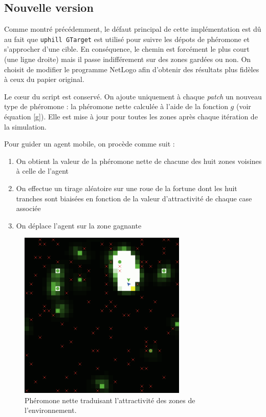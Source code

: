 \documentclass[12pt]{article}
\begin{document}
\subsection{Nouvelle version}

Comme montré précédemment, le défaut principal de cette implémentation
est dû au fait que \texttt{uphill GTarget} est utilisé pour suivre les
dépots de phéromone et s'approcher d'une cible. En conséquence, le
chemin est forcément le plus court (une ligne droite) mais il passe
indifférement sur des zones gardées ou non. On choisit de modifier le
programme NetLogo afin d'obtenir des résultats plus fidèles à ceux du
papier original.

Le c\oe ur du script est conservé. On ajoute uniquement à chaque
\textit{patch} un nouveau type de phéromone : la phéromone nette
calculée à l'aide de la fonction $g$ (voir équation \ref{g}). Elle est
mise à jour pour toutes les zones après chaque itération de la
simulation.

Pour guider un agent mobile, on procède comme suit :

\begin{enumerate}
  \item{On obtient la valeur de la phéromone nette de chacune des huit
    zones voisines à celle de l'agent}
  \item{On effectue un tirage aléatoire sur une roue de la fortune
    dont les huit tranches sont biaisées en fonction de la valeur
    d'attractivité de chaque case associée}
  \item{On déplace l'agent sur la zone gagnante}
\end{enumerate}

\begin{figure}[H]
  \centering

  \includegraphics[width=8cm]{pheromones_net.png}

  \caption{Phéromone nette traduisant l'attractivité des zones de
    l'environnement.}
  \label{net}
\end{figure}
\end{document}
